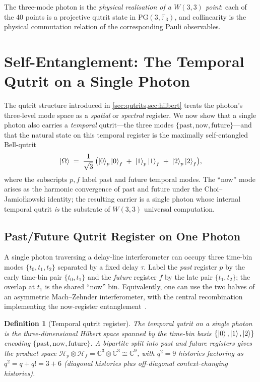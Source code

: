 ﻿\documentclass[12pt]{article}
\newtheorem{definition}[theorem]{Definition}
\newcommand{\CC}{\mathbb{C}}
\newcommand{\GF}[1]{\mathbb{F}_{#1}}
\newcommand{\PG}[2]{\mathrm{PG}(#1,#2)}
\begin{document}
The three-mode photon is the \emph{physical realisation of a $W(3,3)$ point}: each
of the 40 points is a projective qutrit state in $\PG{3}{\GF{3}}$, and collinearity
is the physical commutation relation of the corresponding Pauli observables.

\section{Self-Entanglement: The Temporal Qutrit on a Single Photon}
\label{sec:self-entanglement}

The qutrit structure introduced in \cref{sec:qutrits,sec:hilbert} treats the
photon's three-level mode space as a \emph{spatial} or \emph{spectral} register.
We now show that a single photon also carries a \emph{temporal} qutrit---the three
modes $\{\text{past},\text{now},\text{future}\}$---and that the natural state on
this temporal register is the maximally self-entangled Bell-qutrit
\begin{equation}
  \ket{\Omega} \;=\; \frac{1}{\sqrt 3}\,\bigl(\ket{0}_p\ket{0}_f
    \;+\;\ket{1}_p\ket{1}_f \;+\;\ket{2}_p\ket{2}_f\bigr),
  \label{eq:bellqutrit}
\end{equation}
where the subscripts $p,f$ label past and future temporal modes.  The ``now'' mode
arises as the harmonic convergence of past and future under the Choi--Jamio\l kowski
identity; the resulting carrier is a single photon whose internal temporal qutrit
\emph{is} the substrate of $W(3,3)$ universal computation.

\subsection{Past/Future Qutrit Register on One Photon}

A single photon traversing a delay-line interferometer can occupy three
time-bin modes $\{t_0, t_1, t_2\}$ separated by a fixed delay $\tau$.  Label the
\emph{past} register $p$ by the early time-bin pair $\{t_0,t_1\}$ and the
\emph{future} register $f$ by the late pair $\{t_1,t_2\}$; the overlap at $t_1$
is the shared ``now'' bin.  Equivalently, one can use the two halves of an
asymmetric Mach--Zehnder interferometer, with the central recombination
implementing the now-register entanglement~\cite{Brendel1999,Marcikic2002}.

\begin{definition}[Temporal qutrit register]\label{def:tempqutrit}
The \emph{temporal qutrit} on a single photon is the three-dimensional Hilbert
space spanned by the time-bin basis $\{\ket{0},\ket{1},\ket{2}\}$ encoding
$\{\text{past},\text{now},\text{future}\}$.  A bipartite split into past and future
registers gives the product space
$\mathcal H_p \otimes \mathcal H_f = \CC^3 \otimes \CC^3 \cong \CC^9$,
with $q^2 = 9$ histories factoring as $q^2 = q + q!= 3 + 6$ (diagonal histories
plus off-diagonal context-changing histories).
\end{definition}
\end{document}
